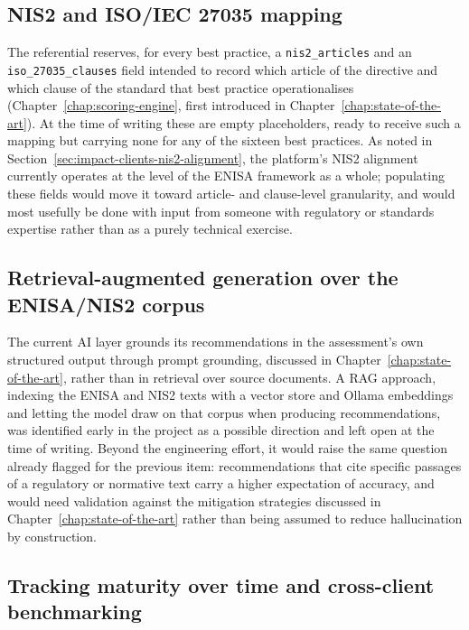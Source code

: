 \subsection{NIS2 and ISO/IEC 27035 mapping}
\label{sec:impact-perspectives-nis2-iso-mapping}

The referential reserves, for every best practice, a \texttt{nis2\_articles} and an \texttt{iso\_27035\_clauses} field intended to record which article of the directive and which clause of the standard that best practice operationalises (Chapter~\ref{chap:scoring-engine}, first introduced in Chapter~\ref{chap:state-of-the-art}). At the time of writing these are empty placeholders, ready to receive such a mapping but carrying none for any of the sixteen best practices. As noted in Section~\ref{sec:impact-clients-nis2-alignment}, the platform's NIS2 alignment currently operates at the level of the ENISA framework as a whole; populating these fields would move it toward article- and clause-level granularity, and would most usefully be done with input from someone with regulatory or standards expertise rather than as a purely technical exercise.

\subsection{Retrieval-augmented generation over the ENISA/NIS2 corpus}
\label{sec:impact-perspectives-rag}

The current AI layer grounds its recommendations in the assessment's own structured output through prompt grounding, discussed in Chapter~\ref{chap:state-of-the-art}, rather than in retrieval over source documents. A RAG approach, indexing the ENISA and NIS2 texts with a vector store and Ollama embeddings and letting the model draw on that corpus when producing recommendations, was identified early in the project as a possible direction and left open at the time of writing. Beyond the engineering effort, it would raise the same question already flagged for the previous item: recommendations that cite specific passages of a regulatory or normative text carry a higher expectation of accuracy, and would need validation against the mitigation strategies discussed in Chapter~\ref{chap:state-of-the-art} rather than being assumed to reduce hallucination by construction.

\subsection{Tracking maturity over time and cross-client benchmarking}
\label{sec:impact-perspectives-versioning-benchmarking}


